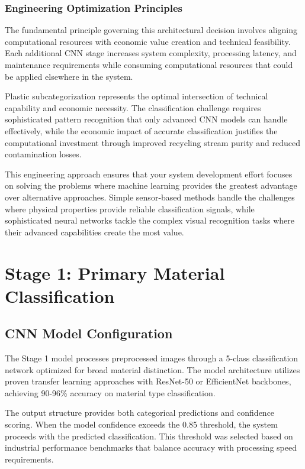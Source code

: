 \documentclass[11pt, a4paper]{article}
\begin{document}
\subsubsection{Engineering Optimization Principles}

The fundamental principle governing this architectural decision involves aligning computational resources with economic value creation and technical feasibility. Each additional CNN stage increases system complexity, processing latency, and maintenance requirements while consuming computational resources that could be applied elsewhere in the system.

Plastic subcategorization represents the optimal intersection of technical capability and economic necessity. The classification challenge requires sophisticated pattern recognition that only advanced CNN models can handle effectively, while the economic impact of accurate classification justifies the computational investment through improved recycling stream purity and reduced contamination losses.

This engineering approach ensures that your system development effort focuses on solving the problems where machine learning provides the greatest advantage over alternative approaches. Simple sensor-based methods handle the challenges where physical properties provide reliable classification signals, while sophisticated neural networks tackle the complex visual recognition tasks where their advanced capabilities create the most value.

\section{Stage 1: Primary Material Classification}

\subsection{CNN Model Configuration}
The Stage 1 model processes preprocessed images through a 5-class classification network optimized for broad material distinction. The model architecture utilizes proven transfer learning approaches with ResNet-50 or EfficientNet backbones, achieving 90-96\% accuracy on material type classification.

The output structure provides both categorical predictions and confidence scoring. When the model confidence exceeds the 0.85 threshold, the system proceeds with the predicted classification. This threshold was selected based on industrial performance benchmarks that balance accuracy with processing speed requirements.
\end{document}
